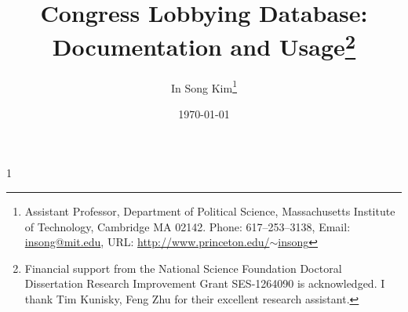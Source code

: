 \documentclass[11pt,letterpaper]{article}
\theoremstyle{plain}
\newcommand{\blind}{1}
\begin{document}
\newcommand\ud{\mathrm{d}}
\newcommand\dist{\buildrel\rm d\over\sim}
\newcommand\ind{\stackrel{\rm indep.}{\sim}}
\newcommand\iid{\stackrel{\rm i.i.d.}{\sim}}
\newcommand\logit{{\rm logit}}
\renewcommand\r{\right}
\renewcommand\l{\left}
\newcommand\cY{\mathcal{Y}}
\newcommand\cZ{\mathcal{Z}}
\newcommand\E{\mathbb{E}}
\newcommand\V{\mathbb{V}}
\newcommand\wY{\widetilde{Y}}
\newcommand\cE{\mathcal{E}}
\newcommand\cN{\mathcal{N}}
\newcommand\cX{\mathcal{X}}
\newcommand\bA{\mathbf{A}}
\newcommand\bB{\mathbf{B}}
\newcommand\bI{\mathbf{I}}
\newcommand\bt{\mathbf{t}}
\newcommand\bz{\mathbf{z}}
\newcommand\bone{\mathbf{1}}
\newcommand\bzero{\mathbf{0}}
\newcommand\tomega{\tilde\omega}
\newcommand{\argmax}{\operatornamewithlimits{argmax}}

\newcommand\spacingset[1]{\renewcommand{\baselinestretch}%
{#1}\small\normalsize}

\spacingset{1}

\newcommand{\tit}{\bf Congress Lobbying Database:\\ Documentation and Usage}


\blind


\author{In Song Kim\thanks{Assistant Professor, Department of
    Political Science, Massachusetts Institute of Technology,
    Cambridge MA 02142. Phone: 617--253--3138, Email:
    \href{mailto:insong@mit.edu}{insong@mit.edu}, URL:
    \href{http://www.princeton.edu/~insong}{http://www.princeton.edu/$\sim$insong}}}


{\title{\tit\thanks{Financial support from the National Science
      Foundation Doctoral Dissertation Research Improvement Grant
      SES-1264090 is acknowledged. I thank Tim Kunisky, Feng Zhu for
      their excellent research assistant.}}

  \date{\today}

\maketitle
}\fi


\thispagestyle{empty}
\setcounter{page}{0}


\end{document}
